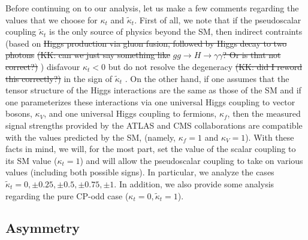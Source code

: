 \documentclass[aps,preprint,tightenlines,floatfix,superscriptaddress,nofootinbib,showpacs]{revtex4-1}
\def\kp{\kappa_t}
\def\kpt{\tilde{\kappa}_t}
\providecommand{\DIFadd}[1]{{\protect\color{blue}\uwave{#1}}} %
\providecommand{\DIFdel}[1]{{\protect\color{red}\sout{#1}}}                      %
\providecommand{\DIFaddbegin}{} %
\providecommand{\DIFaddend}{} %
\providecommand{\DIFdelbegin}{} %
\providecommand{\DIFdelend}{} %
\begin{document}
Before continuing on to our analysis, let us make a few comments
regarding the values that we choose for $\kp$ and $\kpt$.
First of all, we note that if the pseudoscalar
coupling $\kpt$ is the only source of physics beyond the SM,
then indirect contraints (based on \DIFdelbegin \DIFdel{Higgs production via gluon fusion,
followed by Higgs decay to two photons }%
\DIFdel{(KK: can we just say
  something like }\DIFdelend \DIFaddbegin \DIFadd{the signal strength of }\DIFaddend $gg\to H \to \gamma\gamma$\DIFdelbegin \DIFdel{?  Or is that not
  correct?) 
}%
\DIFdelend ) 
disfavour $\kp < 0$ but do not
resolve the degeneracy \DIFdelbegin %
\DIFdel{(KK: did I reword this correctly?)}%
\DIFdelend in the sign of $\kpt$ \cite{Guadagnoli}. On
the other hand, if one assumes that the tensor structure of the
Higgs interactions are the
same as those of the SM and if one parameterizes these interactions via
one universal Higgs coupling to vector bosons, $\kappa_V$, and one
universal Higgs coupling to fermions, $\kappa_f$, then the measured signal
strengths provided by the ATLAS and CMS collaborations are compatible with
the values predicted by the SM, (namely, $\kappa_f=1$ and $\kappa_V=1$).
With these facts in mind, we will, for the most part,
set the value of the scalar coupling to its SM
value ($\kp=1$) and will allow the pseudoscalar coupling to take on
various values (including both possible signs). In particular, we
analyze the cases $\kpt=0,\pm 0.25, \pm 0.5, \pm 0.75,\pm 1$.
In addition, we also provide some analysis regarding the pure
$\mathrm{CP}$-odd case ($\kp=0,\kpt=1$).
\subsection{Asymmetry}
\label{sec3.1}
\DIFaddbegin 
\end{document}
